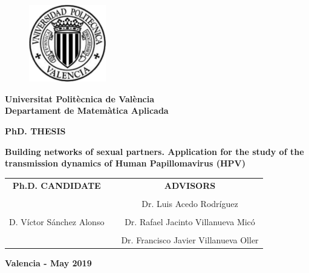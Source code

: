 \thispagestyle{empty}

\begin{figure}[h]
  	\centering
  	 \includegraphics[width=0.3\textwidth]{IMG/escudo_upv_transp.pdf}
\end{figure}
\begin{center}
\textbf{\normalsize Universitat Polit\`{e}cnica de Val\`{e}ncia}\\
\textbf{\normalsize Departament de Matem\`{a}tica Aplicada}

\vspace{1cm}

\scriptsize{\textbf{PhD. THESIS}}

\vspace{0.5cm}

\begin{center}
\textbf{\Huge Building networks of sexual partners. Application for the study of the transmission dynamics of Human Papillomavirus (HPV)}
\end{center}

\vspace{3cm}

\begin{tabular}{ccc}
\textbf{Ph.D. CANDIDATE} 				& \hspace{0.7cm} &\textbf{ADVISORS} \\
 										& \hspace{0.7cm} &\\
 										& \hspace{0.7cm} &\normalsize{Dr. Luis Acedo Rodr\'{i}guez \hfill} \\
										& \hspace{0.7cm} &\\
\normalsize{D. V\'{i}ctor S\'{a}nchez Alonso} 	& \hspace{0.7cm} & \normalsize{Dr. Rafael Jacinto Villanueva Mic\'{o} \hfill } \\ 
										& \hspace{0.7cm} &\\
 										& \hspace{0.7cm} & \normalsize{Dr. Francisco Javier Villanueva Oller \hfill} \\ 
\end{tabular} 

\vspace{2cm}

\normalsize{\textbf{Valencia - May 2019}}

\end{center}
